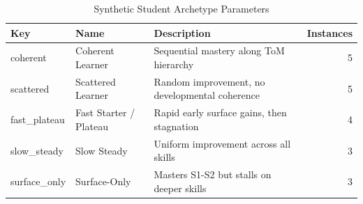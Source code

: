\begin{table}[htbp]
\caption{Synthetic Student Archetype Parameters}
\label{tab:archetypes}
\begin{tabular}{lllr}
\toprule
Key & Name & Description & Instances \\
\midrule
coherent & Coherent Learner & Sequential mastery along ToM hierarchy & 5 \\
scattered & Scattered Learner & Random improvement, no developmental coherence & 5 \\
fast_plateau & Fast Starter / Plateau & Rapid early surface gains, then stagnation & 4 \\
slow_steady & Slow Steady & Uniform improvement across all skills & 3 \\
surface_only & Surface-Only & Masters S1-S2 but stalls on deeper skills & 3 \\
\bottomrule
\end{tabular}
\end{table}